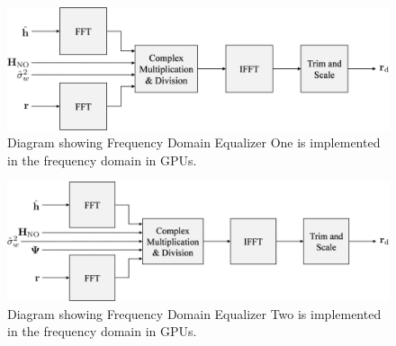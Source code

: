 \begin{figure}
	\centering\includegraphics[width=9.73in/100*55]{figures/eq_GPUimplementation/blockFDE1.pdf}
	\caption{Diagram showing Frequency Domain Equalizer One is implemented in the frequency domain in GPUs.}
	\label{fig:blockFDE1}
\end{figure}
\begin{figure}
	\centering\includegraphics[width=10.03in/100*55]{figures/eq_GPUimplementation/blockFDE2.pdf}
	\caption{Diagram showing Frequency Domain Equalizer Two is implemented in the frequency domain in GPUs.}
	\label{fig:blockFDE2}
\end{figure}





